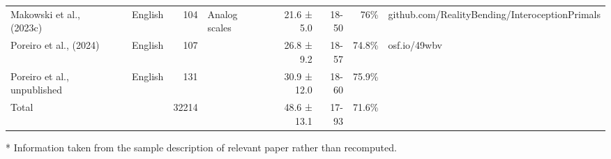 \begin{table}[!t]
\begin{tabular*}{\linewidth}{@{\extracolsep{\fill}}lllrlrrrl}
Makowski et al., (2023c) &  & English & 104 & Analog scales & 21.6 ± 5.0 & 18-50 & 76\% & github.com/RealityBending/InteroceptionPrimals \\ 
Poreiro et al., (2024) &  & English & 107 &  & 26.8 ± 9.2 & 18-57 & 74.8\% & osf.io/49wbv \\ 
Poreiro et al., unpublished &  & English & 131 &  & 30.9 ± 12.0 & 18-60 & 75.9\% &  \\ 
Total &  &  & 32214 &  & 48.6 ± 13.1 & 17-93 & 71.6\% &  \\ 
\bottomrule
\end{tabular*}
\begin{minipage}{\linewidth}
* Information taken from the sample description of relevant paper rather than recomputed.\\
\end{minipage}
\end{table}

